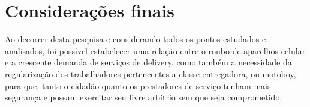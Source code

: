 \section{Considerações finais}

    Ao decorrer desta pesquisa e considerando todos os pontos estudados e analisados,
    foi possível estabelecer uma relação entre o roubo de aparelhos celular e a
    crescente demanda de serviços de delivery, como também a necessidade da regularização
    dos trabalhadores pertencentes a classe entregadora, ou motoboy, para que, tanto o cidadão
    quanto os prestadores de serviço tenham mais segurança e possam exercitar seu livre arbítrio
    sem que seja comprometido.

\postextual